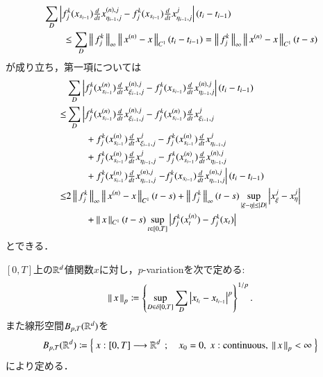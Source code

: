 \begin{prf}
\begin{align}
		&\sum_D \left|f^k_j(x_{s_{i-1}}) \tfrac{d}{dt}x^{(n),j}_{\eta_{i-1},j}
			- f^k_j(x_{s_{i-1}}) \tfrac{d}{dt}x^j_{\eta_{i-1},j} \right|(t_i - t_{i-1}) \\
		&\qquad \leq \sum_D \left\|\, f^k_j\, \right\|_{\infty} \left\|\, x^{(n)} - x\, \right\|_{C^1} (t_i - t_{i-1})
		= \left\|\, f^k_j\, \right\|_{\infty} \left\|\, x^{(n)} - x\, \right\|_{C^1}(t - s)
	\end{align}
	が成り立ち，第一項については
	\begin{align}
		&\sum_D \left| f^k_j(x^{(n)}_{s_{i-1}}) \tfrac{d}{dt}x^{(n),j}_{\xi_{i-1},j} 
			- f^k_j(x_{s_{i-1}}) \tfrac{d}{dt}x^{(n),j}_{\eta_{i-1},j} \right|(t_i - t_{i-1}) \\
		\leq &\sum_D \left| f^k_j(x^{(n)}_{s_{i-1}}) \tfrac{d}{dt}x^{(n),j}_{\xi_{i-1},j} 
			- f^k_j(x^{(n)}_{s_{i-1}}) \tfrac{d}{dt}x^{j}_{\xi_{i-1},j} \right.\\
			&\qquad + f^k_j(x^{(n)}_{s_{i-1}}) \tfrac{d}{dt}x^{j}_{\xi_{i-1},j}
			- f^k_j(x^{(n)}_{s_{i-1}}) \tfrac{d}{dt}x^{j}_{\eta_{i-1},j} \\
			&\qquad + f^k_j(x^{(n)}_{s_{i-1}}) \tfrac{d}{dt}x^{j}_{\eta_{i-1},j}
			- f^k_j(x^{(n)}_{s_{i-1}}) \tfrac{d}{dt}x^{(n),j}_{\eta_{i-1},j} \\
			&\qquad + f^k_j(x^{(n)}_{s_{i-1}}) \tfrac{d}{dt}x^{(n),j}_{\eta_{i-1},j}
			\left. - f^k_j(x_{s_{i-1}}) \tfrac{d}{dt}x^{(n),j}_{\eta_{i-1},j} \right|(t_i - t_{i-1}) \\
		\leq &2\left\|\, f^k_j\, \right\|_{\infty} \left\|\, x^{(n)} - x\, \right\|_{C^1}(t - s)
			+ \left\|\, f^k_j\, \right\|_{\infty}(t-s) \operatorname*{sup}_{|\xi - \eta| \leq |D|} \left|x^j_\xi - x^j_\eta \right| \\
			&\qquad + \left\|\, x\, \right\|_{C^1}(t-s)\operatorname*{sup}_{t \in [0,T]} \left|f^k_j(x^{(n)}_t) - f^k_j(x_t) \right|
	\end{align}
	とできる．
\end{prf}

\begin{screen}
	\begin{dfn}[$p$-variation]
		$[0,T]$上の$\mathbb{R}^d$値関数$x$に対し，$p$-variationを次で定める:
		\begin{align}
			\left\|\, x\, \right\|_{p}
			\coloneqq \left\{ \operatorname*{sup}_{D \in \delta[0,T]} \sum_{D} 
				\left| x_{t_i} - x_{t_{i-1}} \right|^p \right\}^{1/p}.
		\end{align}
		また線形空間$B_{p,T}(\mathbb{R}^d)$を
		\begin{align}
			B_{p,T}(\R^d)
			\coloneqq \Set{x:[0,T] \longrightarrow \R^d}{x_0=0,\ x:\mbox{continuous},\ \Norm{x}{p} < \infty}
		\end{align}
		により定める．
	\end{dfn}
\end{screen}

